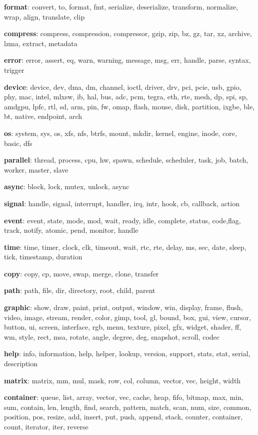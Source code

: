 \textbf{format}: convert, to, format, fmt, serialize, deserialize, transform, normalize, wrap, align, translate, clip

\textbf{compress}: compress, compression, compressor, gzip, zip, bz, gz, tar, xz, archive, lzma, extract, metadata

\textbf{error}: error, assert, eq, warn, warning, message, msg, err, handle, parse, syntax, trigger

\textbf{device}: device, dev, dma, dm, channel, ioctl, driver, drv, pci, pcie, usb, gpio, phy, mac, intel, mlxsw, ib, hal, bus, adc, pcm, tegra, eth, rte, mesh, dp, spi, sp, amdgpu, lpfc, rtl, sd, arm, pin, fw, omap, flash, mouse, disk, partition, ixgbe, ble, bt, native, endpoint, arch

\textbf{os}: system, sys, os, xfs, nfs, btrfs, mount, mkdir, kernel, engine, inode, core, basic, dfs

\textbf{parallel}: thread, process, cpu, hw, spawn, schedule, scheduler, task, job, batch, worker, master, slave

\textbf{async}: block, lock, mutex, unlock, async

\textbf{signal}: handle, signal, interrupt, handler, irq, intr, hook, cb, callback, action

\textbf{event}: event, state, mode, mod, wait, ready, idle, complete, status, code,flag, track, notify, atomic, pend, monitor, handle

\textbf{time}: time, timer, clock, clk, timeout, wait, rtc, rte, delay, ms, sec, date, sleep, tick, timestamp, duration

\textbf{copy}: copy, cp, move, swap, merge, clone, transfer

\textbf{path}: path, file, dir, directory, root, child, parent

\textbf{graphic}: show, draw, paint, print, output, window, win, display, frame, flush, video, image, stream, render, color, gimp, tool, gl, bound, box, gui, view, cursor, button, ui, screen, interface, rgb, menu, texture, pixel, gfx, widget, shader, ff, wm, style, rect, msa, rotate, angle, degree, deg, snapshot, scroll, codec

\textbf{help}: info, information, help, helper, lookup, version, support, stats, stat, serial, description

\textbf{matrix}: matrix, mm, mul, mask, row, col, column, vector, vec, height, width

\textbf{container}: queue, list, array, vector, vec, cache, heap, fifo, bitmap, max, min, sum, contain, len, length, find, search, pattern, match, scan, num, size, common, position, pos, resize, add, insert, put, push, append, stack, counter, container, count, iterator, iter, reverse

